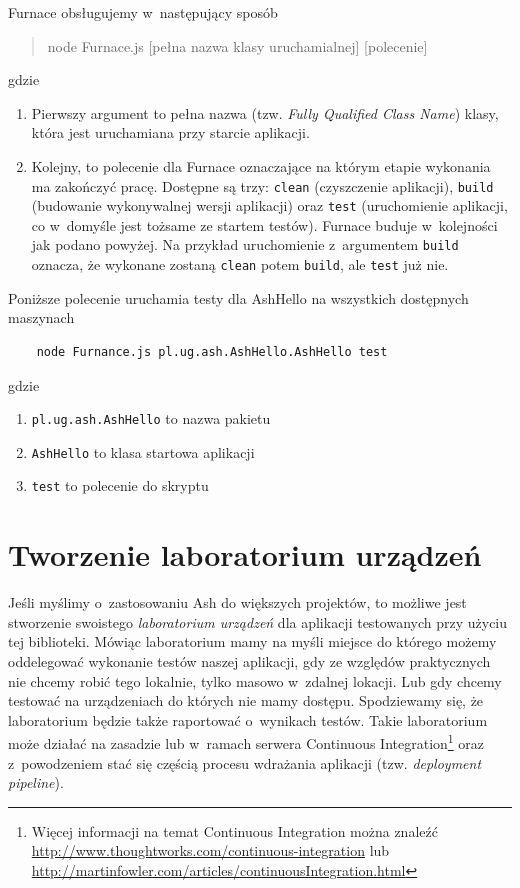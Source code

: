 \documentclass[brudnopis]{xmgr}
\begin{document}
Furnace obsługujemy w~następujący sposób

\begin{quote}
	node Furnace.js [pełna nazwa klasy uruchamialnej] [polecenie]
\end{quote}

gdzie

\begin{enumerate}
  \item Pierwszy argument to pełna nazwa (tzw. \textit{Fully Qualified Class Name}) klasy, która jest uruchamiana przy starcie aplikacji. 
  \item Kolejny, to polecenie dla Furnace oznaczające na którym etapie wykonania ma zakończyć pracę. Dostępne są trzy: \texttt{clean} (czyszczenie aplikacji), \texttt{build} (budowanie wykonywalnej wersji aplikacji) oraz \texttt{test} (uruchomienie aplikacji, co w~domyśle jest tożsame ze startem testów). Furnace buduje w~kolejności jak podano powyżej. Na przykład uruchomienie z~argumentem \texttt{build} oznacza, że wykonane zostaną \texttt{clean} potem \texttt{build}, ale \texttt{test} już nie.
\end{enumerate}

Poniższe polecenie uruchamia testy dla AshHello na wszystkich dostępnych maszynach 

\begin{lstlisting}
	node Furnance.js pl.ug.ash.AshHello.AshHello test
\end{lstlisting}

gdzie

\begin{enumerate}
  \item \texttt{pl.ug.ash.AshHello} to nazwa pakietu
  \item \texttt{AshHello} to klasa startowa aplikacji
  \item \texttt{test} to polecenie do skryptu 
\end{enumerate}

\section{Tworzenie laboratorium urządzeń}

Jeśli myślimy o~zastosowaniu Ash do większych projektów, to możliwe jest stworzenie swoistego \textit{laboratorium urządzeń} dla aplikacji testowanych przy użyciu tej biblioteki. Mówiąc laboratorium mamy na myśli miejsce do którego możemy oddelegować wykonanie testów naszej aplikacji, gdy ze względów praktycznych nie chcemy robić tego lokalnie, tylko masowo w~zdalnej lokacji. Lub gdy chcemy testować na urządzeniach do których nie mamy dostępu. Spodziewamy się, że laboratorium będzie także raportować o~wynikach testów. Takie laboratorium może działać na zasadzie lub w~ramach serwera Continuous Integration\footnote{ Więcej informacji na temat Continuous Integration można znaleźć \url{http://www.thoughtworks.com/continuous-integration} lub \url{http://martinfowler.com/articles/continuousIntegration.html} } oraz z~powodzeniem stać się częścią procesu wdrażania aplikacji (tzw. \textit{deployment pipeline}).
\end{document}
